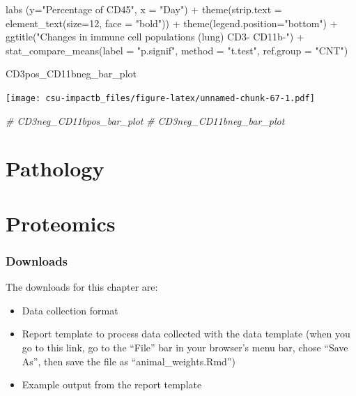 \documentclass[
]{book}
\newenvironment{Shaded}{\begin{snugshade}}{\end{snugshade}}
\newcommand{\AttributeTok}[1]{\textcolor[rgb]{0.77,0.63,0.00}{#1}}
\newcommand{\CommentTok}[1]{\textcolor[rgb]{0.56,0.35,0.01}{\textit{#1}}}
\newcommand{\DecValTok}[1]{\textcolor[rgb]{0.00,0.00,0.81}{#1}}
\newcommand{\FunctionTok}[1]{\textcolor[rgb]{0.00,0.00,0.00}{#1}}
\newcommand{\NormalTok}[1]{#1}
\newcommand{\SpecialCharTok}[1]{\textcolor[rgb]{0.00,0.00,0.00}{#1}}
\newcommand{\StringTok}[1]{\textcolor[rgb]{0.31,0.60,0.02}{#1}}
\providecommand{\tightlist}{%
  \setlength{\itemsep}{0pt}\setlength{\parskip}{0pt}}
\begin{document}
\begin{Shaded}
\begin{Highlighting}[]
  \FunctionTok{labs}\NormalTok{ (}\AttributeTok{y=}\StringTok{"Percentage of CD45"}\NormalTok{, }\AttributeTok{x =} \StringTok{"Day"}\NormalTok{) }\SpecialCharTok{+} 
  \FunctionTok{theme}\NormalTok{(}\AttributeTok{strip.text =} \FunctionTok{element\_text}\NormalTok{(}\AttributeTok{size=}\DecValTok{12}\NormalTok{, }\AttributeTok{face =} \StringTok{"bold"}\NormalTok{)) }\SpecialCharTok{+} \FunctionTok{theme}\NormalTok{(}\AttributeTok{legend.position=}\StringTok{"bottom"}\NormalTok{) }\SpecialCharTok{+}
  \FunctionTok{ggtitle}\NormalTok{(}\StringTok{"Changes in immune cell populations (lung) CD3{-} CD11b{-}"}\NormalTok{) }\SpecialCharTok{+}
  \FunctionTok{stat\_compare\_means}\NormalTok{(}\AttributeTok{label =} \StringTok{"p.signif"}\NormalTok{, }\AttributeTok{method =} \StringTok{"t.test"}\NormalTok{,}
                     \AttributeTok{ref.group =} \StringTok{"CNT"}\NormalTok{)}

\NormalTok{CD3pos\_CD11bneg\_bar\_plot}
\end{Highlighting}
\end{Shaded}

\texttt{[image: csu-impactb\_files/figure-latex/unnamed-chunk-67-1.pdf]}

\begin{Shaded}
\begin{Highlighting}[]
\CommentTok{\# CD3neg\_CD11bpos\_bar\_plot}
\CommentTok{\# CD3neg\_CD11bneg\_bar\_plot}
\end{Highlighting}
\end{Shaded}

\hypertarget{pathology}{%
\chapter{Pathology}\label{pathology}}

\hypertarget{proteomics}{%
\chapter{Proteomics}\label{proteomics}}

\hypertarget{downloads-2}{%
\subsection{Downloads}\label{downloads-2}}

The downloads for this chapter are:

\begin{itemize}
\tightlist
\item
  Data collection format
\item
  Report template to process data collected with the data template (when you go to this link, go to the ``File'' bar in your browser's menu bar, chose ``Save As'', then save the file as ``animal\_weights.Rmd'')
\item
  Example output from the report template
\end{itemize}
\end{document}
